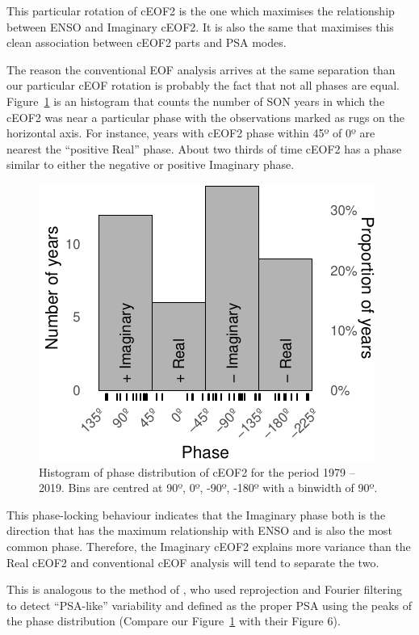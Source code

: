 \documentclass[smallextended]{svjour3}       %
\begin{document}
This particular rotation of cEOF2 is the one which maximises the relationship between ENSO and Imaginary cEOF2. It is also the same that maximises this clean association between cEOF2 parts and PSA modes.

The reason the conventional EOF analysis arrives at the same separation than our particular cEOF rotation is probably the fact that not all phases are equal. Figure~\ref{fig:phase-histogram} is an histogram that counts the number of SON years in which the cEOF2 was near a particular phase with the observations marked as rugs on the horizontal axis. For instance, years with cEOF2 phase within 45º of 0º are nearest the ``positive Real'' phase. About two thirds of time cEOF2 has a phase similar to either the negative or positive Imaginary phase.



\begin{figure}
\centering
\includegraphics{../figures/phase-histogram-1.pdf}
\caption{\label{fig:phase-histogram}Histogram of phase distribution of cEOF2 for the period 1979 -- 2019. Bins are centred at 90º, 0º, -90º, -180º with a binwidth of 90º.}
\end{figure}

This phase-locking behaviour indicates that the Imaginary phase both is the direction that has the maximum relationship with ENSO and is also the most common phase. Therefore, the Imaginary cEOF2 explains more variance than the Real cEOF2 and conventional cEOF analysis will tend to separate the two.

This is analogous to the method of \citet{irving2016}, who used reprojection and Fourier filtering to detect ``PSA-like'' variability and defined as the proper PSA using the peaks of the phase distribution (Compare our Figure~\ref{fig:phase-histogram} with their Figure 6).
\end{document}
